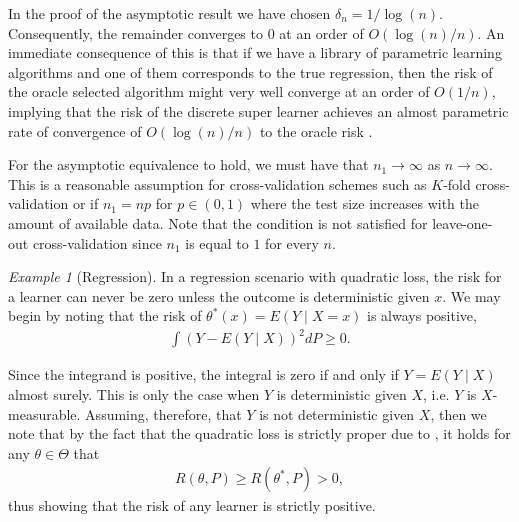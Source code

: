 \documentclass[11pt, a4paper]{article}
\theoremstyle{definition}
\theoremstyle{remark}
\newtheorem{example}{Example}
\begin{document}
In the proof of the asymptotic result we have chosen $ \delta_n = 1/\log(n) $. Consequently, the remainder converges to $ 0 $ at an order of $ O(\log(n)/n) $. An immediate consequence of this is that if we have a library of parametric learning algorithms and one of them corresponds to the true regression, then the risk of the oracle selected algorithm might very well converge at an order of $ O(1/n) $, implying that the risk of the discrete super learner achieves an almost parametric rate of convergence of $ O(\log(n)/n) $ to the oracle risk \parencite{van2007super}.  

For the asymptotic equivalence to hold, we must have that $ n_1 \to \infty $ as $ n \to \infty $. This is a reasonable assumption for cross-validation schemes such as $ K $-fold cross-validation or if $ n_1 = np $ for $ p \in (0,1) $ where the test size increases with the amount of available data. Note that the condition is not satisfied for leave-one-out cross-validation since $ n_1$ is equal to $ 1 $ for every $ n $.  

\begin{example}[Regression]
   In a regression scenario with quadratic loss, the risk for a learner can never be zero unless the outcome is deterministic given $ x $. We may begin by noting that the risk of $ \theta^*(x) = E(Y \mid X = x) $ is always positive,
   \begin{align*}
       \int (Y - E(Y \mid X))^2 d P \geq 0. 
   \end{align*}

   Since the integrand is positive, the integral is zero if and only if $ Y = E(Y \mid X) $ almost surely. This is only the case when $ Y $ is deterministic given $ X $, i.e. $ Y $ is $ X $-measurable. Assuming, therefore, that $ Y $ is not deterministic given $ X $, then we note that by the fact that the quadratic loss is strictly proper due to , it holds for any $ \theta \in \Theta $ that
   \begin{align*}
       R(\theta, P) \geq R(\theta^*, P) > 0,
   \end{align*}
    thus showing that the risk of any learner is strictly positive.
\end{example}
\end{document}
